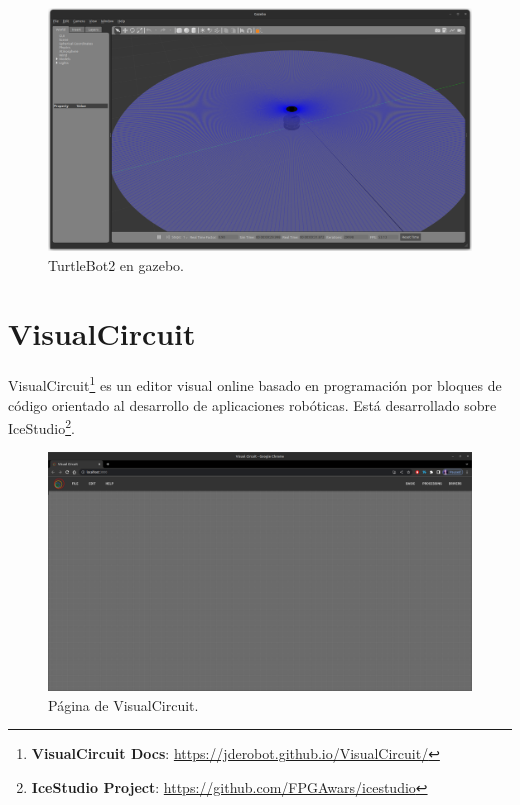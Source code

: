 \begin{figure} [H]
    \begin{center}
        \includegraphics[width=14cm]{figs/c3/turtlebot2_sim.png}
    \end{center}
    \caption[TurtleBot2 simulado]{TurtleBot2 en gazebo.}
    \label{fig:turtlebot_2_sim}
\end{figure}

\section{VisualCircuit}
\label{sec:visualcircuit}

VisualCircuit\footnote{\textbf{VisualCircuit Docs}: \url{https://jderobot.github.io/VisualCircuit/}} es un editor visual online basado en
programación por bloques de código orientado al desarrollo de aplicaciones robóticas. Está desarrollado sobre
IceStudio\footnote{\textbf{IceStudio Project}: \url{https://github.com/FPGAwars/icestudio}}.\\

\begin{figure} [H]
    \begin{center}
        \includegraphics[width=13cm]{figs/c3/empty_VC.png}
    \end{center}
    \caption[VisualCircuit]{Página de VisualCircuit.}
    \label{fig:VC_empty}
\end{figure}

